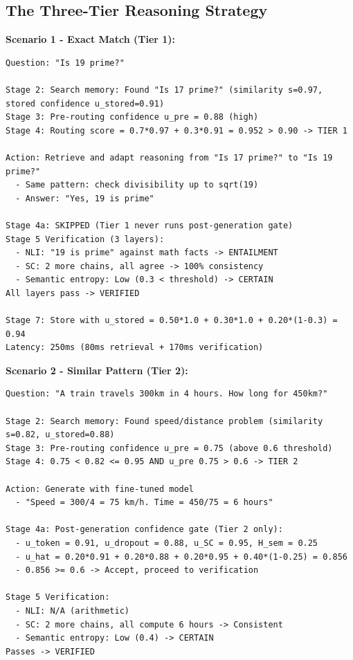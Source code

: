 \documentclass[12pt,a4paper]{article}
\theoremstyle{definition}
\begin{document}
\subsection{The Three-Tier Reasoning Strategy}

\begin{examplebox}[title=How CAEM Decides What To Do]

\textbf{Scenario 1 - Exact Match (Tier 1):}
\begin{verbatim}
Question: "Is 19 prime?"

Stage 2: Search memory: Found "Is 17 prime?" (similarity s=0.97, stored confidence u_stored=0.91)
Stage 3: Pre-routing confidence u_pre = 0.88 (high)
Stage 4: Routing score = 0.7*0.97 + 0.3*0.91 = 0.952 > 0.90 -> TIER 1

Action: Retrieve and adapt reasoning from "Is 17 prime?" to "Is 19 prime?"
  - Same pattern: check divisibility up to sqrt(19)
  - Answer: "Yes, 19 is prime"

Stage 4a: SKIPPED (Tier 1 never runs post-generation gate)
Stage 5 Verification (3 layers):
  - NLI: "19 is prime" against math facts -> ENTAILMENT
  - SC: 2 more chains, all agree -> 100% consistency
  - Semantic entropy: Low (0.3 < threshold) -> CERTAIN
All layers pass -> VERIFIED

Stage 7: Store with u_stored = 0.50*1.0 + 0.30*1.0 + 0.20*(1-0.3) = 0.94
Latency: 250ms (80ms retrieval + 170ms verification)
\end{verbatim}

\textbf{Scenario 2 - Similar Pattern (Tier 2):}
\begin{verbatim}
Question: "A train travels 300km in 4 hours. How long for 450km?"

Stage 2: Search memory: Found speed/distance problem (similarity s=0.82, u_stored=0.88)
Stage 3: Pre-routing confidence u_pre = 0.75 (above 0.6 threshold)
Stage 4: 0.75 < 0.82 <= 0.95 AND u_pre 0.75 > 0.6 -> TIER 2

Action: Generate with fine-tuned model
  - "Speed = 300/4 = 75 km/h. Time = 450/75 = 6 hours"

Stage 4a: Post-generation confidence gate (Tier 2 only):
  - u_token = 0.91, u_dropout = 0.88, u_SC = 0.95, H_sem = 0.25
  - u_hat = 0.20*0.91 + 0.20*0.88 + 0.20*0.95 + 0.40*(1-0.25) = 0.856
  - 0.856 >= 0.6 -> Accept, proceed to verification

Stage 5 Verification:
  - NLI: N/A (arithmetic)
  - SC: 2 more chains, all compute 6 hours -> Consistent
  - Semantic entropy: Low (0.4) -> CERTAIN
Passes -> VERIFIED


\end{verbatim}
\end{examplebox}
\end{document}
